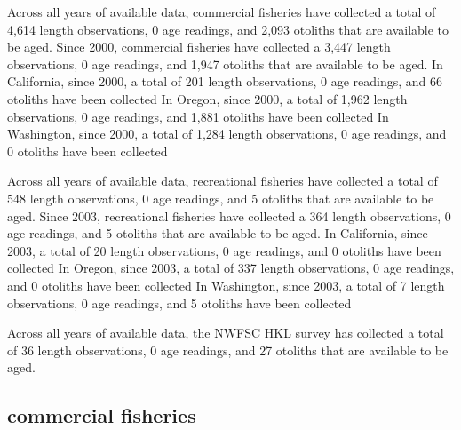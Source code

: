 \documentclass[11pt,
  english,
  letterpaper,
]{article}
\begin{document}

Across all years of available data, commercial fisheries have collected a total of 4,614 length observations, 0 age readings, and 2,093 otoliths that are available to be aged. Since 2000, commercial fisheries have collected a 3,447 length observations, 0 age readings, and 1,947 otoliths that are available to be aged. In California, since 2000, a total of 201 length observations, 0 age readings, and 66 otoliths have been collected In Oregon, since 2000, a total of 1,962 length observations, 0 age readings, and 1,881 otoliths have been collected In Washington, since 2000, a total of 1,284 length observations, 0 age readings, and 0 otoliths have been collected

\leavevmode\tagmcend\tagstructend\par


Across all years of available data, recreational fisheries have collected a total of 548 length observations, 0 age readings, and 5 otoliths that are available to be aged. Since 2003, recreational fisheries have collected a 364 length observations, 0 age readings, and 5 otoliths that are available to be aged. In California, since 2003, a total of 20 length observations, 0 age readings, and 0 otoliths have been collected In Oregon, since 2003, a total of 337 length observations, 0 age readings, and 0 otoliths have been collected In Washington, since 2003, a total of 7 length observations, 0 age readings, and 5 otoliths have been collected

\leavevmode\tagmcend\tagstructend\par


Across all years of available data, the NWFSC HKL survey has collected a total of 36 length observations, 0 age readings, and 27 otoliths that are available to be aged.

\leavevmode\tagmcend\tagstructend\par


\hypertarget{commercial-fisheries-41}{%
\subsection{commercial fisheries}\label{commercial-fisheries-41}}

\leavevmode\tagmcend\tagstructend
\end{document}
